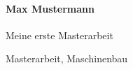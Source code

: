 \paragraph{Max Mustermann}
\begin{description}[style=nextline]
  \item[Thema der Masterthesis]
    Meine erste Masterarbeit
  \item[Stichworte]
    Masterarbeit, Maschinenbau
  \item[Kurzzusammenfassung]
    \lipsum[1]
\end{description}